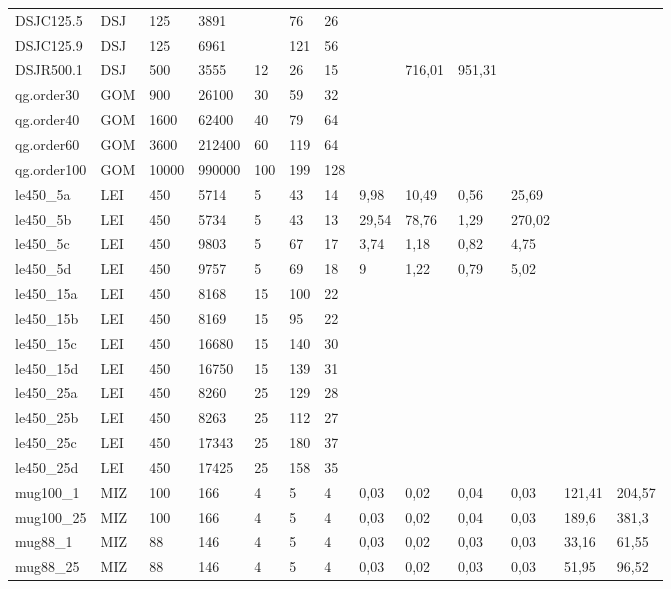 \documentclass{sig-alternate}
\begin{document}
\begin{table}[b]
{\begin{tabular}{lllllllllllll}
DSJC125.5 & DSJ & 125 & 3891 &  & 76 & 26 &  &  &  &  &  &  \\
DSJC125.9 & DSJ & 125 & 6961 &  & 121 & 56 &  &  &  &  &  &  \\
DSJR500.1 & DSJ & 500 & 3555 & 12 & 26 & 15 &  & 716,01 & 951,31 &  &  &  \\
qg.order30 & GOM & 900 & 26100 & 30 & 59 & 32 &  &  &  &  &  &  \\
qg.order40 & GOM & 1600 & 62400 & 40 & 79 & 64 &  &  &  &  &  &  \\
qg.order60 & GOM & 3600 & 212400 & 60 & 119 & 64 &  &  &  &  &  &  \\
qg.order100 & GOM & 10000 & 990000 & 100 & 199 & 128 &  &  &  &  &  &  \\
le450\_5a & LEI & 450 & 5714 & 5 & 43 & 14 & 9,98 & 10,49 & 0,56 & 25,69 &  &  \\
le450\_5b & LEI & 450 & 5734 & 5 & 43 & 13 & 29,54 & 78,76 & 1,29 & 270,02 &  &  \\
le450\_5c & LEI & 450 & 9803 & 5 & 67 & 17 & 3,74 & 1,18 & 0,82 & 4,75 &  &  \\
le450\_5d & LEI & 450 & 9757 & 5 & 69 & 18 & 9 & 1,22 & 0,79 & 5,02 &  &  \\
le450\_15a & LEI & 450 & 8168 & 15 & 100 & 22 &  &  &  &  &  &  \\
le450\_15b & LEI & 450 & 8169 & 15 & 95 & 22 &  &  &  &  &  &  \\
le450\_15c & LEI & 450 & 16680 & 15 & 140 & 30 &  &  &  &  &  &  \\
le450\_15d & LEI & 450 & 16750 & 15 & 139 & 31 &  &  &  &  &  &  \\
le450\_25a & LEI & 450 & 8260 & 25 & 129 & 28 &  &  &  &  &  &  \\
le450\_25b & LEI & 450 & 8263 & 25 & 112 & 27 &  &  &  &  &  &  \\
le450\_25c & LEI & 450 & 17343 & 25 & 180 & 37 &  &  &  &  &  &  \\
le450\_25d & LEI & 450 & 17425 & 25 & 158 & 35 &  &  &  &  &  &  \\
mug100\_1 & MIZ & 100 & 166 & 4 & 5 & 4 & 0,03 & 0,02 & 0,04 & 0,03 & 121,41 & 204,57 \\
mug100\_25 & MIZ & 100 & 166 & 4 & 5 & 4 & 0,03 & 0,02 & 0,04 & 0,03 & 189,6 & 381,3 \\
mug88\_1 & MIZ & 88 & 146 & 4 & 5 & 4 & 0,03 & 0,02 & 0,03 & 0,03 & 33,16 & 61,55 \\
mug88\_25 & MIZ & 88 & 146 & 4 & 5 & 4 & 0,03 & 0,02 & 0,03 & 0,03 & 51,95 & 96,52 \\

\end{tabular}}
\end{table}
\end{document}
